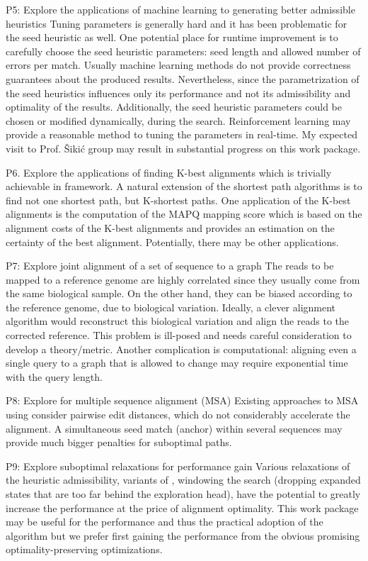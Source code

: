 P5: Explore the applications of machine learning to generating better admissible
heuristics Tuning parameters is generally hard and it has been problematic for
the seed heuristic as well. One potential place for runtime improvement is to
carefully choose the seed heuristic parameters: seed length and allowed number
of errors per match. Usually machine learning methods do not provide correctness
guarantees about the produced results. Nevertheless, since the parametrization
of the seed heuristics influences only its performance and not its admissibility
and optimality of the results. Additionally, the seed heuristic parameters could
be chosen or modified dynamically, during the \A search. Reinforcement learning
may provide a reasonable method to tuning the parameters in real-time. My
expected visit to Prof. Šikić group may result in substantial progress on this
work package.

P6. Explore the applications of finding K-best alignments which is trivially
achievable in \A framework. A natural extension of the shortest path algorithms
is to find not one shortest path, but K-shortest paths. One application of the
K-best alignments is the computation of the MAPQ mapping score which is based on
the alignment costs of the K-best alignments and provides an estimation on the
certainty of the best alignment. Potentially, there may be other applications.

P7: Explore joint alignment of a set of sequence to a graph The reads to be mapped
to a reference genome are highly correlated since they usually come from the
same biological sample. On the other hand, they can be biased according to the
reference genome, due to biological variation. Ideally, a clever alignment
algorithm would reconstruct this biological variation and align the reads to the
corrected reference. This problem is ill-posed and needs careful consideration
to develop a theory/metric. Another complication is computational: aligning even
a single query to a graph that is allowed to change may require exponential time
with the query length.

P8: Explore \A for multiple sequence alignment (MSA) Existing approaches to MSA
using \A consider pairwise edit distances, which do not considerably accelerate
the alignment. A simultaneous seed match (anchor) within several sequences may
provide much bigger penalties for suboptimal paths.

P9: Explore suboptimal relaxations for performance gain Various relaxations of
the heuristic admissibility, variants of \A, windowing the search (dropping
expanded states that are too far behind the exploration head), have the
potential to greatly increase the performance at the price of alignment
optimality. This work package may be useful for the performance and thus the
practical adoption of the algorithm but we prefer first gaining the performance
from the obvious promising optimality-preserving optimizations.

